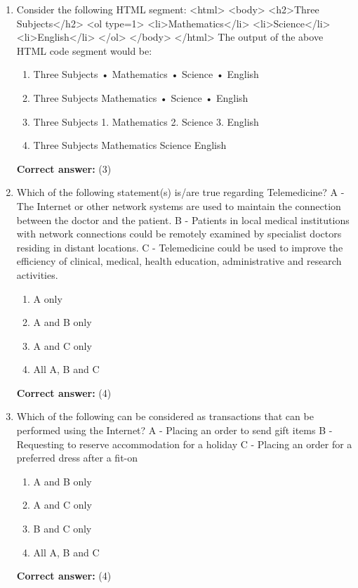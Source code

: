 \documentclass[12pt]{article}
\begin{document}
\begin{enumerate}[label=Q\arabic*:,leftmargin=*,resume]
\item Consider the following HTML segment: <html> <body> <h2>Three Subjects</h2> <ol type=1> <li>Mathematics</li> <li>Science</li> <li>English</li> </ol> </body> </html> The output of the above HTML code segment would be:\\
\begin{enumerate}[label=(\arabic*)]
\item Three Subjects • Mathematics • Science • English
\item Three Subjects Mathematics • Science • English
\item Three Subjects 1. Mathematics 2. Science 3. English
\item Three Subjects Mathematics Science English
\end{enumerate}
\textbf{Correct answer:} (3)

\item Which of the following statement(s) is/are true regarding Telemedicine? A - The Internet or other network systems are used to maintain the connection between the doctor and the patient. B - Patients in local medical institutions with network connections could be remotely examined by specialist doctors residing in distant locations. C - Telemedicine could be used to improve the efficiency of clinical, medical, health education, administrative and research activities.\\
\begin{enumerate}[label=(\arabic*)]
\item A only
\item A and B only
\item A and C only
\item All A, B and C
\end{enumerate}
\textbf{Correct answer:} (4)

\item Which of the following can be considered as transactions that can be performed using the Internet? A - Placing an order to send gift items B - Requesting to reserve accommodation for a holiday C - Placing an order for a preferred dress after a fit-on\\
\begin{enumerate}[label=(\arabic*)]
\item A and B only
\item A and C only
\item B and C only
\item All A, B and C
\end{enumerate}
\textbf{Correct answer:} (4)


\end{enumerate}
\end{document}

